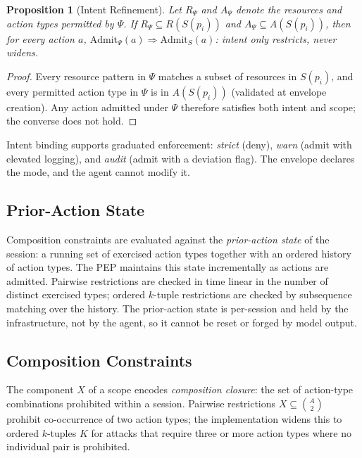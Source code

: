 \documentclass[sigconf,nonacm]{acmart}
\newtheorem{proposition}{Proposition}[section]
\begin{document}
\begin{proposition}[Intent Refinement]\label{prop:intent}
Let $R_\Psi$ and $A_\Psi$ denote the resources and action types permitted by $\Psi$. If $R_\Psi \subseteq R(S(p_i))$ and $A_\Psi \subseteq A(S(p_i))$, then for every action $a$, $\mathrm{Admit}_\Psi(a) \Rightarrow \mathrm{Admit}_S(a)$: intent only restricts, never widens.
\end{proposition}

\begin{proof}
Every resource pattern in $\Psi$ matches a subset of resources in $S(p_i)$, and every permitted action type in $\Psi$ is in $A(S(p_i))$ (validated at envelope creation). Any action admitted under $\Psi$ therefore satisfies both intent and scope; the converse does not hold.
\end{proof}

Intent binding supports graduated enforcement: \emph{strict} (deny), \emph{warn} (admit with elevated logging), and \emph{audit} (admit with a deviation flag). The envelope declares the mode, and the agent cannot modify it.

\subsection{Prior-Action State}\label{sec:prior-action}

Composition constraints are evaluated against the \emph{prior-action state} of the session: a running set of exercised action types together with an ordered history of action types. The PEP maintains this state incrementally as actions are admitted. Pairwise restrictions are checked in time linear in the number of distinct exercised types; ordered $k$-tuple restrictions are checked by subsequence matching over the history. The prior-action state is per-session and held by the infrastructure, not by the agent, so it cannot be reset or forged by model output.

\subsection{Composition Constraints}\label{sec:composition}

The component $X$ of a scope encodes \emph{composition closure}: the set of action-type combinations prohibited within a session. Pairwise restrictions $X \subseteq \binom{A}{2}$ prohibit co-occurrence of two action types; the implementation widens this to ordered $k$-tuples $K$ for attacks that require three or more action types where no individual pair is prohibited.
\end{document}
